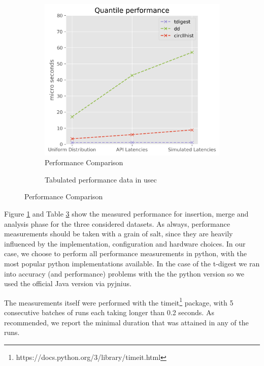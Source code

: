 \documentclass{article}
\theoremstyle{plain}
\theoremstyle{remark}
\begin{document}
\begin{figure}
\begin{subfigure}{\textwidth}
      \includegraphics[width=\textwidth/3]{evaluation/images/all_perf_quantile.png}
      \caption{Performance Comparison}
      \label{fig:perf}
    \end{subfigure}
    \begin{subfigure}{\textwidth}
      \centering
      
      \caption{Tabulated performance data in usec\protect\footnotemark}
      \label{tab:perf}
    \end{subfigure}
    \caption{Performance Comparison}
\end{figure}


Figure \ref{fig:perf} and Table \ref{tab:perf} show the measured performance for insertion, merge
and analysis phase for the three considered datasets. As always, performance measurements should be
taken with a grain of salt, since they are heavily influenced by the implementation, configuration
and hardware choices. In our case, we choose to perform all performance measurements in python, with
the most popular python implementations available.  In the case of the t-digest we ran into accuracy
(and performance) problems with the the python version so we used the official Java version via
pyjnius.

The measurements itself were performed with the
timeit\footnote{https://docs.python.org/3/library/timeit.html} package, with 5 consecutive batches
of runs each taking longer than 0.2 seconds.  As recommended, we report the minimal duration that
was attained in any of the runs.
\end{document}
